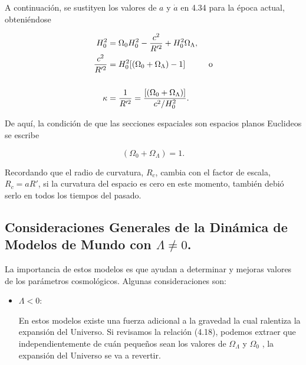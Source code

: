 \documentclass[11pt]{article}
\begin{document}
{    A continuación, se sustityen los valores de $a$ y $\dot{a}$ en 4.34 para la época actual, obteniéndose
    
    \begin{align}
        H_0^2 & = \Omega_0 H_0^2  - \frac{c^2}{R'^2} +  H_0^2 \Omega_{\Lambda}, \notag \\
        \frac{c^2}{R'^2} & = H_0^2 [(\Omega_0 + \Omega_{\Lambda}) - 1] \hspace{1cm} \text{o} \\
        \notag \\
        \kappa & = \frac{1}{R'^2} = \frac{[(\Omega_0 + \Omega_{\Lambda})]}{c^2/H_0^2}.
    \end{align}
        
   De aquí, la condición de que las secciones espaciales son espacios planos Euclideos se escribe 
   
   \begin{equation}
      (\Omega_0 + \Omega_{\Lambda}) = 1. 
   \end{equation}
  
   
   Recordando que el radio de curvatura, $R_c$, cambia con el factor de escala, $R_c=aR'$, si la curvatura del espacio es cero en este momento, también debió serlo en todos los tiempos del pasado. 
    
    
    
    \subsection{Consideraciones Generales de la Dinámica de Modelos de Mundo con $\Lambda \neq 0$. }
    
    La importancia de estos modelos es que ayudan a determinar y mejoras valores de los parámetros cosmológicos. Algunas consideraciones son: 
    
    \begin{itemize}
        \item $\Lambda < 0$: 
        
            En estos modelos existe una fuerza adicional a la gravedad la cual ralentiza la expansión del Universo. Si revisamos la relación (4.18), podemos extraer que independientemente de cuán pequeños sean los valores de $\Omega_{\Lambda}$ y  $\Omega_{0}$ , la expansión del Universo se va a revertir. 
        

\end{itemize}}
\end{document}
